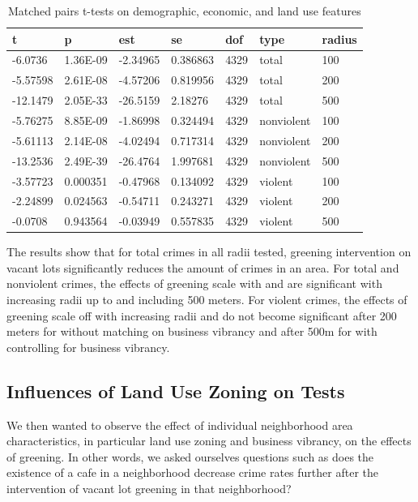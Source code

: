 \documentclass{article}
\begin{document}
\begin{table}[h]
\begin{center}
\caption{\label{tab:h}Matched pairs t-tests on demographic, economic, and land use features}
\begin{tabular}{lllllll}
\hline
\textbf{t} & \textbf{p} & \textbf{est} & \textbf{se} & \textbf{dof} & \textbf{type}       & \textbf{radius} \\ \hline
-6.0736    & 1.36E-09   & -2.34965     & 0.386863    & 4329         & total         & 100             \\
-5.57598   & 2.61E-08   & -4.57206     & 0.819956    & 4329         & total         & 200             \\
-12.1479   & 2.05E-33   & -26.5159     & 2.18276     & 4329         & total         & 500             \\
-5.76275   & 8.85E-09   & -1.86998     & 0.324494    & 4329         & nonviolent    & 100             \\
-5.61113   & 2.14E-08   & -4.02494     & 0.717314    & 4329         & nonviolent    & 200             \\
-13.2536   & 2.49E-39   & -26.4764     & 1.997681    & 4329         & nonviolent    & 500             \\
-3.57723   & 0.000351   & -0.47968     & 0.134092    & 4329         & violent       & 100             \\
-2.24899   & 0.024563   & -0.54711     & 0.243271    & 4329         & violent       & 200             \\
-0.0708    & 0.943564   & -0.03949     & 0.557835    & 4329         & violent       & 500             \\ \hline
\end{tabular}
\end{center}
\end{table}
The results show that for total crimes in all radii tested, greening intervention on vacant lots significantly reduces the amount of crimes in an area. For total and nonviolent crimes, the effects of greening scale with and are significant with increasing radii up to and including 500 meters. For violent crimes, the effects of greening scale off with increasing radii and do not become significant after 200 meters for without matching on business vibrancy and after 500m for with controlling for business vibrancy.
\subsection{Influences of Land Use Zoning on Tests}
We then wanted to observe the effect of individual neighborhood area characteristics, in particular land use zoning and business vibrancy, on the effects of greening. In other words, we asked ourselves questions such as does the existence of a cafe in a neighborhood decrease crime rates further after the intervention of vacant lot greening in that neighborhood?
\end{document}
